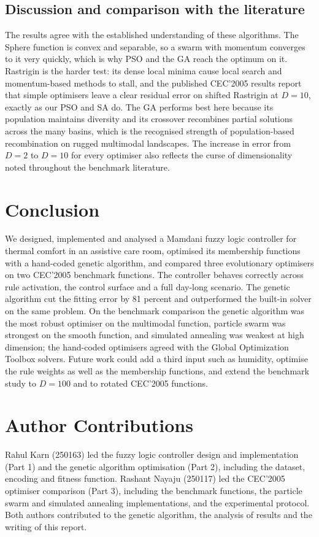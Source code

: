 \documentclass[11pt,a4paper]{article}
\begin{document}
\subsection{Discussion and comparison with the literature}
The results agree with the established understanding of these algorithms. The Sphere function is convex and
separable, so a swarm with momentum converges to it very quickly, which is why PSO and the GA reach the
optimum on it. Rastrigin is the harder test: its dense local minima cause local search and momentum-based
methods to stall, and the published CEC'2005 results report that simple optimisers leave a clear residual
error on shifted Rastrigin at $D=10$, exactly as our PSO and SA do. The GA performs best here because its
population maintains diversity and its crossover recombines partial solutions across the many basins, which
is the recognised strength of population-based recombination on rugged multimodal landscapes. The increase
in error from $D=2$ to $D=10$ for every optimiser also reflects the curse of dimensionality noted
throughout the benchmark literature.

\section{Conclusion}
We designed, implemented and analysed a Mamdani fuzzy logic controller for thermal comfort in an assistive
care room, optimised its membership functions with a hand-coded genetic algorithm, and compared three
evolutionary optimisers on two CEC'2005 benchmark functions. The controller behaves correctly across rule
activation, the control surface and a full day-long scenario. The genetic algorithm cut the fitting error
by 81 percent and outperformed the built-in solver on the same problem. On the benchmark comparison the
genetic algorithm was the most robust optimiser on the multimodal function, particle swarm was strongest on
the smooth function, and simulated annealing was weakest at high dimension; the hand-coded optimisers
agreed with the Global Optimization Toolbox solvers. Future work could add a third input such as humidity,
optimise the rule weights as well as the membership functions, and extend the benchmark study to $D=100$
and to rotated CEC'2005 functions.

\section*{Author Contributions}
Rahul Karn (250163) led the fuzzy logic controller design and implementation (Part 1) and the genetic
algorithm optimisation (Part 2), including the dataset, encoding and fitness function. Rashant Nayaju
(250117) led the CEC'2005 optimiser comparison (Part 3), including the benchmark functions, the
particle swarm and simulated annealing implementations, and the experimental protocol. Both authors
contributed to the genetic algorithm, the analysis of results and the writing of this report.
\end{document}
